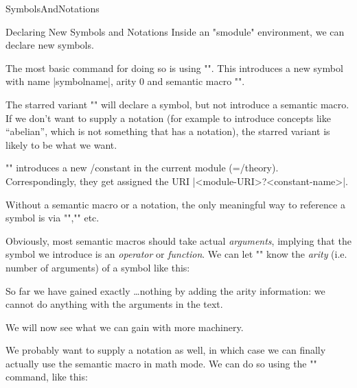 \begin{smodule}[ns=https://github.com/slatex/sTeX/doc]{SymbolsAndNotations}
\begin{sfragment}{Declaring New Symbols and Notations}
  Inside an \stexcode"smodule" environment, we can declare new \sTeX symbols.

\begin{function}{\symdecl}
  The most basic command for doing so is using \stexcode"". This
  introduces a new symbol with name |symbolname|, arity $0$ and semantic macro
  \stexcode"\symbolname".

  The starred variant \stexcode"" will declare a symbol, but not
  introduce a semantic macro.  If we don't want to supply a notation (for example to
  introduce concepts like ``abelian'', which is not something that has a notation), the
  starred variant is likely to be what we want.
\end{function}
\begin{mmtbox}
  \stexcode"\symdecl" introduces a new \omdoc/\mmt constant in the current module
  (=\omdoc/\mmt theory).  Correspondingly, they get assigned the URI
  |<module-URI>?<constant-name>|.
\end{mmtbox}

Without a semantic macro or a notation, the only meaningful way to reference a symbol is
via \stexcode"\symref",\stexcode"\symname" etc.


Obviously, most semantic macros should take actual \emph{arguments}, implying that the
symbol we introduce is an \emph{operator} or \emph{function}. We can let
\stexcode"\symdecl" know the \emph{arity} (i.e. number of arguments) of a symbol like
this:


So far we have gained exactly \ldots nothing by adding the arity information: we cannot do
anything with the arguments in the text.

We will now see what we can gain with more machinery.
    
\begin{function}{\notation}
  We probably want to supply a notation as well, in which case we can finally actually use
  the semantic macro in math mode.  We can do so using the \stexcode"\notation" command,
  like this:


\end{function}
\end{sfragment}
\end{smodule}
